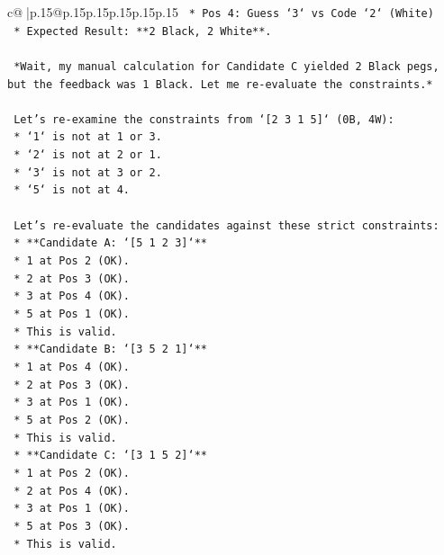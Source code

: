 \documentclass{article}
\begin{document}
{\begin{supertabular}{c@{$\;$}|p{.15\linewidth}@{}p{.15\linewidth}p{.15\linewidth}p{.15\linewidth}p{.15\linewidth}p{.15\linewidth}}
{{{\texttt{        *   Pos 4: Guess `3` vs Code `2` (White)} \\
\texttt{        *   Expected Result: **2 Black, 2 White**.} \\
\\ 
\texttt{    *Wait, my manual calculation for Candidate C yielded 2 Black pegs, but the feedback was 1 Black. Let me re{-}evaluate the constraints.*} \\
\\ 
\texttt{    Let's re{-}examine the constraints from `{[}2 3 1 5{]}` (0B, 4W):} \\
\texttt{    *   `1` is not at 1 or 3.} \\
\texttt{    *   `2` is not at 2 or 1.} \\
\texttt{    *   `3` is not at 3 or 2.} \\
\texttt{    *   `5` is not at 4.} \\
\\ 
\texttt{    Let's re{-}evaluate the candidates against these strict constraints:} \\
\texttt{    *   **Candidate A: `{[}5 1 2 3{]}`**} \\
\texttt{        *   1 at Pos 2 (OK).} \\
\texttt{        *   2 at Pos 3 (OK).} \\
\texttt{        *   3 at Pos 4 (OK).} \\
\texttt{        *   5 at Pos 1 (OK).} \\
\texttt{        *   This is valid.} \\
\texttt{    *   **Candidate B: `{[}3 5 2 1{]}`**} \\
\texttt{        *   1 at Pos 4 (OK).} \\
\texttt{        *   2 at Pos 3 (OK).} \\
\texttt{        *   3 at Pos 1 (OK).} \\
\texttt{        *   5 at Pos 2 (OK).} \\
\texttt{        *   This is valid.} \\
\texttt{    *   **Candidate C: `{[}3 1 5 2{]}`**} \\
\texttt{        *   1 at Pos 2 (OK).} \\
\texttt{        *   2 at Pos 4 (OK).} \\
\texttt{        *   3 at Pos 1 (OK).} \\
\texttt{        *   5 at Pos 3 (OK).} \\
\texttt{        *   This is valid.} \\
\\ 
}}}
\end{supertabular}}
\end{document}
